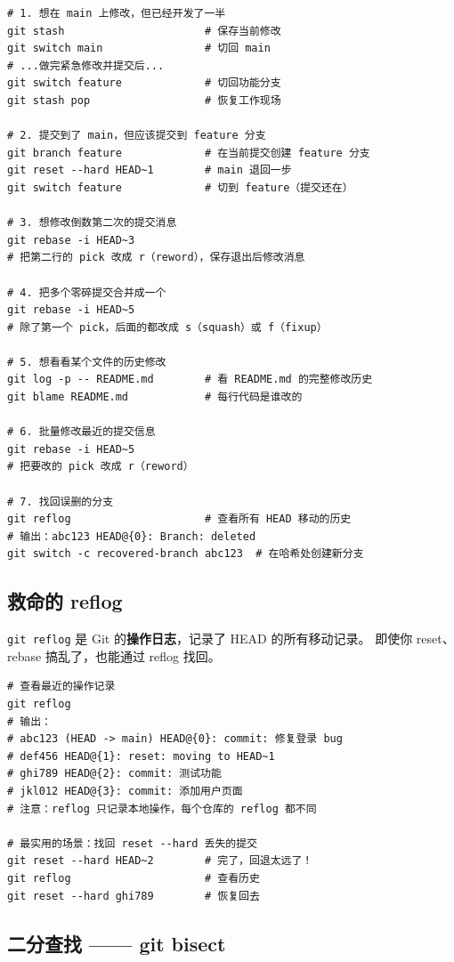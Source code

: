\documentclass[12pt,a4paper]{article}
\begin{document}
\begin{lstlisting}
# 1. 想在 main 上修改，但已经开发了一半
git stash                      # 保存当前修改
git switch main                # 切回 main
# ...做完紧急修改并提交后...
git switch feature             # 切回功能分支
git stash pop                  # 恢复工作现场

# 2. 提交到了 main，但应该提交到 feature 分支
git branch feature             # 在当前提交创建 feature 分支
git reset --hard HEAD~1        # main 退回一步
git switch feature             # 切到 feature（提交还在）

# 3. 想修改倒数第二次的提交消息
git rebase -i HEAD~3
# 把第二行的 pick 改成 r（reword），保存退出后修改消息

# 4. 把多个零碎提交合并成一个
git rebase -i HEAD~5
# 除了第一个 pick，后面的都改成 s（squash）或 f（fixup）

# 5. 想看看某个文件的历史修改
git log -p -- README.md        # 看 README.md 的完整修改历史
git blame README.md            # 每行代码是谁改的

# 6. 批量修改最近的提交信息
git rebase -i HEAD~5
# 把要改的 pick 改成 r（reword）

# 7. 找回误删的分支
git reflog                     # 查看所有 HEAD 移动的历史
# 输出：abc123 HEAD@{0}: Branch: deleted
git switch -c recovered-branch abc123  # 在哈希处创建新分支
\end{lstlisting}

\subsection{救命的 reflog}

\texttt{git reflog} 是 Git 的\textbf{操作日志}，记录了 HEAD 的所有移动记录。
即使你 reset、rebase 搞乱了，也能通过 reflog 找回。

\begin{lstlisting}
# 查看最近的操作记录
git reflog
# 输出：
# abc123 (HEAD -> main) HEAD@{0}: commit: 修复登录 bug
# def456 HEAD@{1}: reset: moving to HEAD~1
# ghi789 HEAD@{2}: commit: 测试功能
# jkl012 HEAD@{3}: commit: 添加用户页面
# 注意：reflog 只记录本地操作，每个仓库的 reflog 都不同

# 最实用的场景：找回 reset --hard 丢失的提交
git reset --hard HEAD~2        # 完了，回退太远了！
git reflog                     # 查看历史
git reset --hard ghi789        # 恢复回去
\end{lstlisting}

\subsection{二分查找 —— git bisect}
\end{document}
